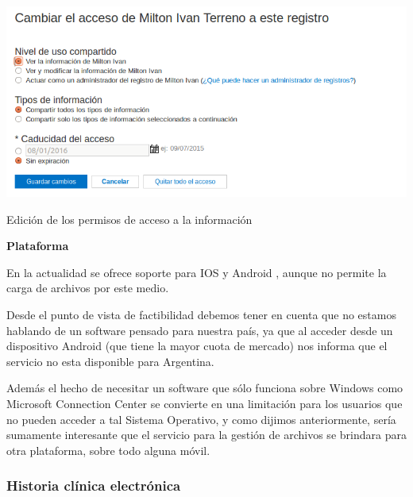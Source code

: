\begin{itemize}
{    \begin{correccionFigure}[h]
      \centering
      \includegraphics[width=.8\textwidth]{img/tp1/3-cambiar_permisos}
      \caption{Edición de los permisos de acceso a la información}
      \label{cambiar_permisos}
    \end{correccionFigure} 
}  
\clearpage
\textbf{Plataforma}



En la actualidad se ofrece soporte para IOS y Android , aunque no permite la carga de archivos por este medio.

	Desde el punto de vista de factibilidad debemos tener en cuenta que no estamos hablando de un software pensado para nuestra país, ya que al acceder desde un dispositivo Android (que tiene la mayor cuota de mercado)  nos informa que el servicio no esta disponible para Argentina. 
	
	Además el hecho de necesitar un software que sólo funciona sobre Windows como Microsoft Connection Center se convierte en una limitación para los usuarios que no pueden acceder a tal Sistema Operativo, y como dijimos anteriormente, sería sumamente interesante que el servicio para la gestión de archivos se brindara para otra plataforma, sobre todo alguna móvil.
\end{itemize}



\clearpage
\subsubsection{Historia clínica electrónica}

